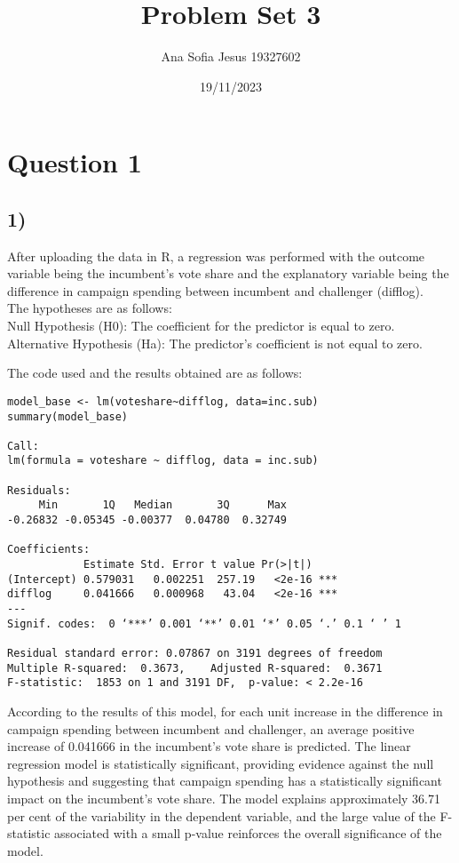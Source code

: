 \documentclass[oneside]{article}
\title{Problem Set 3}
\author{Ana Sofia Jesus 19327602}
\date{19/11/2023}
\begin{document}
\maketitle

\section*{Question 1}
\subsection*{1)}
After uploading the data in R, a regression was performed with the outcome variable being the incumbent's vote share and the explanatory variable being the difference in campaign spending between incumbent and challenger (difflog).
\\
The hypotheses are as follows:\\
Null Hypothesis (H0): The coefficient for the predictor is equal to zero.\\
Alternative Hypothesis (Ha): The predictor's coefficient is not equal to zero.

\hspace{1}

The code used and the results obtained are as follows:

\begin{verbatim}
model_base <- lm(voteshare~difflog, data=inc.sub)
summary(model_base) 

Call:
lm(formula = voteshare ~ difflog, data = inc.sub)

Residuals:
     Min       1Q   Median       3Q      Max 
-0.26832 -0.05345 -0.00377  0.04780  0.32749 

Coefficients:
            Estimate Std. Error t value Pr(>|t|)    
(Intercept) 0.579031   0.002251  257.19   <2e-16 ***
difflog     0.041666   0.000968   43.04   <2e-16 ***
---
Signif. codes:  0 ‘***’ 0.001 ‘**’ 0.01 ‘*’ 0.05 ‘.’ 0.1 ‘ ’ 1

Residual standard error: 0.07867 on 3191 degrees of freedom
Multiple R-squared:  0.3673,	Adjusted R-squared:  0.3671 
F-statistic:  1853 on 1 and 3191 DF,  p-value: < 2.2e-16

\end{verbatim}
According to the results of this model, for each unit increase in the difference in campaign spending between incumbent and challenger, an average positive increase of 0.041666 in the incumbent's vote share is predicted.
The linear regression model is statistically significant, providing evidence against the null hypothesis and suggesting that campaign spending has a statistically significant impact on the incumbent's vote share. The model explains approximately 36.71 per cent of the variability in the dependent variable, and the large value of the F-statistic associated with a small p-value reinforces the overall significance of the model.
\end{document}
